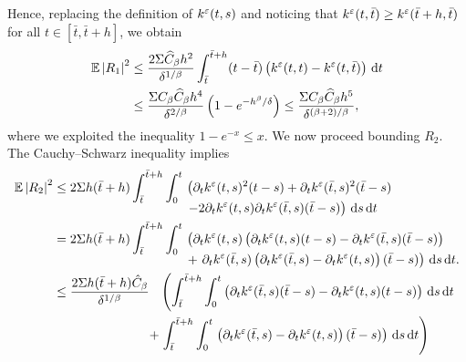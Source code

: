 \documentclass[10pt]{article}
\begin{document}
\begin{appendices}
\begin{equation}
\end{equation}
Hence, replacing the definition of $k^\varepsilon(t, s)$ and noticing that $k^\varepsilon(t, \bar t) \geq k^\varepsilon(\bar t+h, \bar t)$ for all $t \in [\bar t, \bar t + h]$, we obtain
\begin{equation}
\begin{aligned}
\operatorname{\mathbb{E}} \left\lvert R_1\right\rvert^2 &\leq \frac{2\Sigma \widehat C_\beta h^2}{\delta^{1/\beta}}\int_{\bar t}^{\bar t + h}(t - \bar t) \left(k^\varepsilon(t, t) - k^\varepsilon(t, \bar t)\right) \,\mathrm{d} t\\
&\leq \frac{\Sigma C_\beta \widehat C_\beta h^4 }{\delta^{2/\beta}}\left(1 - e^{-h^\beta / \delta}\right) \leq \frac{\Sigma C_\beta \widehat C_\beta h^5}{\delta^{(\beta+2)/\beta}} ,
\end{aligned}
\end{equation}
where we exploited the inequality $1-e^{-x} \leq x$. We now proceed bounding $R_2$. The Cauchy--Schwarz inequality implies
\begin{equation}
\begin{aligned}
\E\abs{R_2}^2 &\leq 2 \Sigma h(\bar t + h)  \int_{\bar t}^{\bar t + h}\int_0^t 
\begin{aligned}[t]
&\left(\partial_t k^\epl(t, s)^2 (t-s)  + \partial_t k^\epl(\bar t, s)^2 (\bar t-s)\right.\\
&\left. -2 \partial_t k^\epl(t, s) \partial_t k^\epl(\bar t, s)(\bar t - s)\right) \dd s \dd t
\end{aligned}
\\
&= 2 \Sigma h(\bar t + h) \int_{\bar t}^{\bar t + h}\int_0^t 
\begin{aligned}[t]
&\left(\partial_t k^\epl(t, s)\left(\partial_t k^\epl(t, s)(t-s) -\partial_t k^\epl(\bar t, s)(\bar t - s)\right)\right.\\
&+ \left.  \partial_t k^\epl(\bar t, s)\left(\partial_t k^\epl(\bar t, s)- \partial_t k^\epl(t, s) \right)(\bar t - s) \right) \dd s \dd t.
\end{aligned}
\\
&\leq \frac{2 \Sigma h(\bar t + h)  \hat C_\beta}{\delta^{1/\beta}} 
\begin{aligned}[t]
&\left( \int_{\bar t}^{\bar t + h}\int_0^t \left(\partial_t k^\epl(\bar t, s)(\bar t - s) - \partial_t k^\epl(t, s)(t-s) \right) \dd s \dd t \right. \\
+ & \left. \int_{\bar t}^{\bar t + h}\int_0^t \left. \left(\partial_t k^\epl(\bar t, s) - \partial_t k^\epl(t, s)\right)(\bar t - s) \right) \dd s \dd t \right) 
\end{aligned}
\\

\end{aligned}
\end{equation}
\end{appendices}
\end{document}
